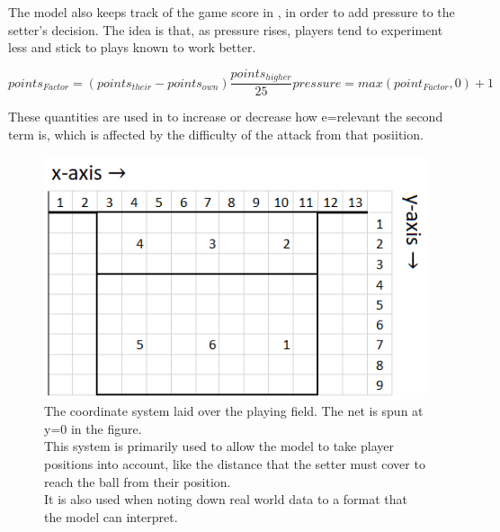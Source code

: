 \documentclass[main.tex]{subfiles}
\begin{document}
      The model also keeps track of the game score in , in order to add pressure to the setter's decision. The idea is that, as pressure rises, players tend to experiment less and stick to plays known to work better.
    
      \begin{subequations}
        \begin{equation}
          points_{Factor}=(points_{their} - points_{own})\frac{points_{higher}}{25} 
          \label{equ:points}
        \end{equation}
        \begin{equation}
          pressure= max( point_{Factor}, 0) + 1      
          \label{equ:pressure}
        \end{equation}
        \label{equ:score}
      \end{subequations}
      
      These quantities are used in  to increase or decrease how e=relevant the second term is, which is affected by the difficulty of the attack from that posiition.
      
      \begin{figure}
        \centering
        \includegraphics[width=0.5\linewidth]{figures/playingFieldGridLabelled}
        \caption{The coordinate system laid over the playing field. The net is spun at y=0 in the figure. \\
          This system is primarily used to allow the model to take player positions into account, like the distance that the setter must cover to reach the ball from their position. \\
          It is also used when noting down real world data to a format that the model can interpret.}
        \label{fig:field}
      \end{figure}
    
\end{document}
